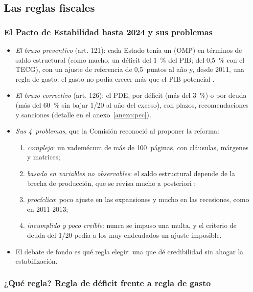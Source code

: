 \documentclass[11pt]{article}
\begin{document}
\subsection{Las reglas fiscales}\label{sec:reglas-fiscales}

\subsubsection{El Pacto de Estabilidad hasta 2024 y sus problemas}\label{sec:pec}

\begin{itemize}
\item \emph{El brazo preventivo} (art. 121): cada Estado tenía un  (OMP) en términos de saldo estructural (como mucho, un déficit del 1~\% del PIB; del 0,5~\% con el TECG), con un ajuste de referencia de 0,5~puntos al año y, desde 2011, una regla de gasto: el gasto no podía crecer más que el PIB potencial .
\item \emph{El brazo correctivo} (art. 126): el PDE, por déficit (más del 3~\%) o por deuda (más del 60~\% sin bajar 1/20 al año del exceso), con plazos, recomendaciones y sanciones (detalle en el anexo~\ref{anexo:pec}).
\item \emph{Sus 4~problemas}, que la Comisión reconoció al proponer la reforma\nocite{BlanchardLeandroZettelmeyer2021}:
  \begin{enumerate}
  \item \emph{complejo}: un vademécum de más de 100~páginas, con cláusulas, márgenes y matrices;
  \item \emph{basado en variables no observables}: el saldo estructural depende de la brecha de producción, que se revisa mucho a posteriori ;
  \item \emph{procíclico}: poco ajuste en las expansiones y mucho en las recesiones, como en 2011-2013;
  \item \emph{incumplido y poco creíble}: nunca se impuso una multa, y el criterio de deuda del 1/20 pedía a los muy endeudados un ajuste imposible.
  \end{enumerate}
\item El debate de fondo es qué regla elegir: una que dé credibilidad sin ahogar la estabilización.
\end{itemize}

\subsubsection{¿Qué regla? Regla de déficit frente a regla de gasto}\label{sec:regla-gasto}
\end{document}
